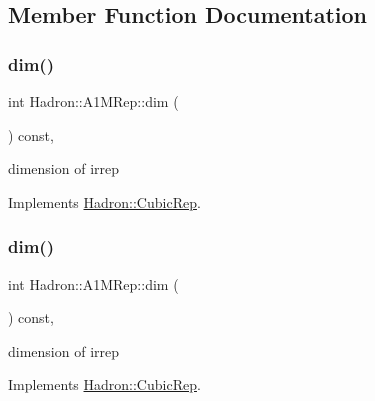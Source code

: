 \subsection{Member Function Documentation}
\mbox{\label{structHadron_1_1A1MRep_a149774bce9c5d4c1fcfeafac85663d04}} 
\subsubsection{\texorpdfstring{dim()}{dim()}\hspace{0.1cm}{\footnotesize\ttfamily [1/3]}}
{\footnotesize\ttfamily int Hadron\+::\+A1\+M\+Rep\+::dim (\begin{DoxyParamCaption}{ }\end{DoxyParamCaption}) const\hspace{0.3cm}{\ttfamily [inline]}, {\ttfamily [virtual]}}

dimension of irrep 

Implements \mbox{\hyperlink{structHadron_1_1CubicRep_ac178d14064f037a66af4b9fb4b312d51}{Hadron\+::\+Cubic\+Rep}}.

\mbox{\label{structHadron_1_1A1MRep_a149774bce9c5d4c1fcfeafac85663d04}} 
\subsubsection{\texorpdfstring{dim()}{dim()}\hspace{0.1cm}{\footnotesize\ttfamily [2/3]}}
{\footnotesize\ttfamily int Hadron\+::\+A1\+M\+Rep\+::dim (\begin{DoxyParamCaption}{ }\end{DoxyParamCaption}) const\hspace{0.3cm}{\ttfamily [inline]}, {\ttfamily [virtual]}}

dimension of irrep 

Implements \mbox{\hyperlink{structHadron_1_1CubicRep_ac178d14064f037a66af4b9fb4b312d51}{Hadron\+::\+Cubic\+Rep}}.

\mbox{\label{structHadron_1_1A1MRep_a149774bce9c5d4c1fcfeafac85663d04}} 
